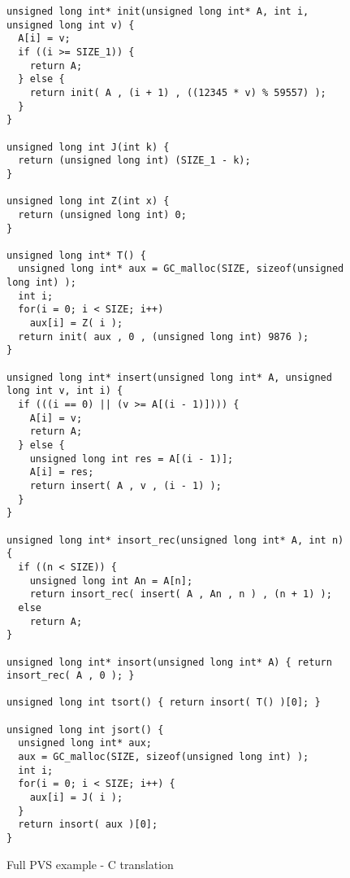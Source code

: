 \documentclass[12pt,a4paper]{article}
\begin{document}
\begin{figure}
\begin{lstlisting}
unsigned long int* init(unsigned long int* A, int i, unsigned long int v) {
  A[i] = v;
  if ((i >= SIZE_1)) {
    return A;
  } else {
    return init( A , (i + 1) , ((12345 * v) % 59557) );
  }
}

unsigned long int J(int k) {
  return (unsigned long int) (SIZE_1 - k);
}

unsigned long int Z(int x) {
  return (unsigned long int) 0;
}

unsigned long int* T() {
  unsigned long int* aux = GC_malloc(SIZE, sizeof(unsigned long int) );
  int i;
  for(i = 0; i < SIZE; i++)
    aux[i] = Z( i );
  return init( aux , 0 , (unsigned long int) 9876 );
}

unsigned long int* insert(unsigned long int* A, unsigned long int v, int i) {
  if (((i == 0) || (v >= A[(i - 1)]))) {
    A[i] = v;
    return A;
  } else {
    unsigned long int res = A[(i - 1)];
    A[i] = res;
    return insert( A , v , (i - 1) );
  }
}

unsigned long int* insort_rec(unsigned long int* A, int n) {
  if ((n < SIZE)) {
    unsigned long int An = A[n];
    return insort_rec( insert( A , An , n ) , (n + 1) );
  else
    return A;
}

unsigned long int* insort(unsigned long int* A) { return insort_rec( A , 0 ); }

unsigned long int tsort() { return insort( T() )[0]; }

unsigned long int jsort() {
  unsigned long int* aux;
  aux = GC_malloc(SIZE, sizeof(unsigned long int) );
  int i;
  for(i = 0; i < SIZE; i++) {
    aux[i] = J( i );
  }
  return insort( aux )[0];
}
\end{lstlisting}
\caption{Full PVS example - C translation}
\end{figure}
\end{document}
